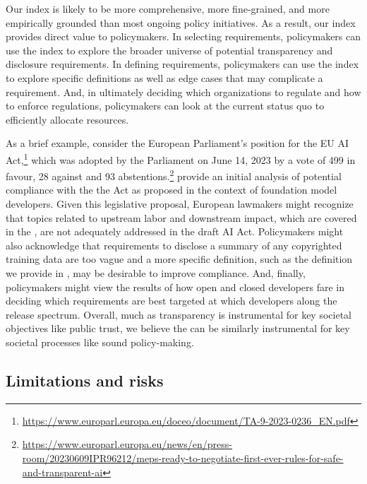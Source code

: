 Our index is likely to be more comprehensive, more fine-grained, and more empirically grounded than most ongoing policy initiatives.
As a result, our index provides direct value to policymakers.
In selecting requirements, policymakers can use the index to explore the broader universe of potential transparency and disclosure requirements.
In defining requirements, policymakers can use the index to explore specific definitions as well as edge cases that may complicate a requirement. 
And, in ultimately deciding which organizations to regulate and how to enforce regulations, policymakers can look at the current status quo to efficiently allocate resources.

As a brief example, consider the European Parliament's position for the EU AI Act,\footnote{\url{https://www.europarl.europa.eu/doceo/document/TA-9-2023-0236_EN.pdf}} which was adopted by the Parliament on June 14, 2023 by a vote of 499 in favour, 28 against and 93 abstentions.\footnote{\url{https://www.europarl.europa.eu/news/en/press-room/20230609IPR96212/meps-ready-to-negotiate-first-ever-rules-for-safe-and-transparent-ai}}
\citet{bommasani2023eu-ai-act} provide an initial analysis of potential compliance with the the Act as proposed in the context of foundation model developers.
Given this legislative proposal, European lawmakers might recognize that topics related to upstream labor and downstream impact, which are covered in the \projectname, are not adequately addressed in the draft AI Act.
Policymakers might also acknowledge that requirements to disclose a summary of any copyrighted training data are too vague and a more specific definition, such as the definition we provide in , may be desirable to improve compliance.
And, finally, policymakers might view the results of how open and closed developers fare in deciding which requirements are best targeted at which developers along the release spectrum.
Overall, much as transparency is instrumental for key societal objectives like public trust, we believe the \projectname can be similarly instrumental for key societal processes like sound policy-making.

\hypertarget{limitations}{\subsection{Limitations and risks}}
\label{sec:limitations}

